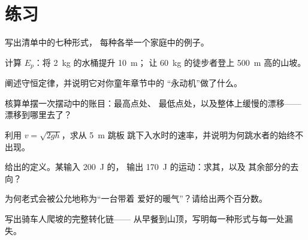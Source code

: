 \section{练习}

\begin{exercise}[$\star$]\label{exo:g9:energy-conversions:1}
写出清单中的七种形式，
每种各举一个家庭中的例子。
\end{exercise}

\begin{exercise}[$\star$]\label{exo:g9:energy-conversions:2}
计算 $E_p$：将 \qty{2}{kg} 的水桶提升 \qty{10}{m}；
让 \qty{60}{kg} 的徒步者登上 \qty{500}{m} 高的山坡。
\end{exercise}

\begin{exercise}[$\star$]\label{exo:g9:energy-conversions:3}
阐述守恒定律，并说明它对你童年章节中的
“永动机”做了什么。
\end{exercise}

\begin{exercise}[$\star$]\label{exo:g9:energy-conversions:4}
核算单摆一次摆动中的账目：最高点处、
最低点处，以及整体上缓慢的漂移——漂移到哪里去了？
\end{exercise}

\begin{exercise}[$\star$]\label{exo:g9:energy-conversions:5}
利用 $v = \sqrt{2 g h}$，求从 \qty{5}{m} 跳板
跳下入水时的速率，并说明为何跳水者的始终不出现。
\end{exercise}

\begin{exercise}[$\star$]\label{exo:g9:energy-conversions:6}
给出的定义。某输入 \qty{200}{J} 的，
输出 \qty{170}{J} 的运动：求其，以及
其余部分的去向？
\end{exercise}

\begin{exercise}[$\star$]\label{exo:g9:energy-conversions:7}
为何老式会被公允地称为“一台带着
爱好的暖气”？请给出两个百分数。
\end{exercise}

\begin{exercise}[$\star$]\label{exo:g9:energy-conversions:8}
写出骑车人爬坡的完整转化链——
从早餐到山顶，写明每一种形式与每一处漏失。
\end{exercise}

